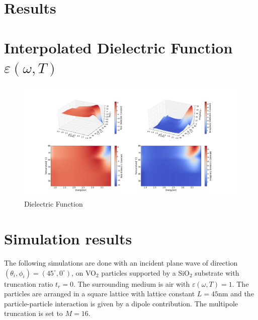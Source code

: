 \section{Results}
\section{Interpolated Dielectric Function $\varepsilon(\omega,T)$}
%
\begin{figure}
    \centering
    \includegraphics[width=\textwidth]{Results/interpPermittivity.png}
    \caption{Dielectric Function}
    \label{fig:DF}
\end{figure}
%

\section{Simulation results}
The following simulations are done with an incident plane wave of direction 
$(\theta_i,\phi_i) = (45^{\circ},0^{\circ})$, on VO$_2$ particles supported by a SiO$_2$ substrate
with truncation ratio $t_r = 0$. The surrounding medium is air with $\varepsilon(\omega,T) = 1$.
The particles are arranged in a square lattice with lattice constant $L = 45$nm and the
particle-particle interaction is given by a dipole contribution. The multipole truncation
is set to $M = 16$.


